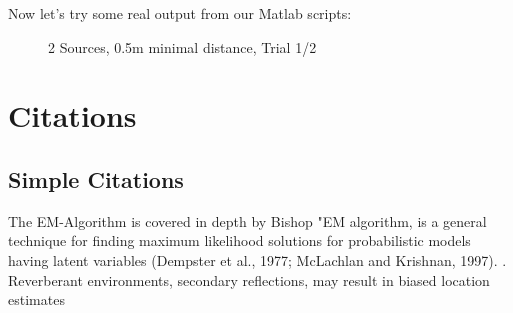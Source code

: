 Now let's try some real output from our Matlab scripts:
\begin{figure}[H]
	\centering
	
	\caption{2 Sources, 0.5m minimal distance, Trial 1/2}
	\label{fig:trial1}
\end{figure}

\newpage
\section{Citations}
\subsection{Simple Citations}
The EM-Algorithm is covered in depth by Bishop "EM algorithm, is a general technique for finding maximum likelihood solutions for probabilistic models having latent variables (Dempster et al., 1977; McLachlan and Krishnan, 1997). \cite[p. 472]{Bishop2006}. Reverberant environments, secondary reflections, may result in biased location estimates \cite[p.1]{Schwartz2014}